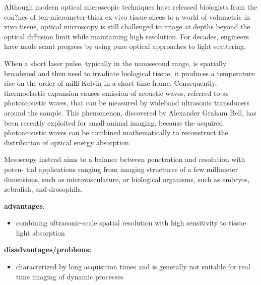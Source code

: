 Although modern optical microscopic techniques have released biologists from the con?nes of ten-micrometer-thick ex vivo tissue slices to a world of volumetric in vivo tissue, optical microscopy is still challenged to image at depths beyond the optical diffusion limit while maintaining high resolution. For decades, engineers have made scant progress by using pure optical approaches to light scattering. 

When a short laser pulse, typically in the nanosecond range, is spatially broadened and then used to irradiate biological tissue, it produces a temperature rise on the order of milli-Kelvin in a short time frame. Consequently, thermoelastic expansion causes emission of acoustic waves, referred to as photoacoustic waves, that can be measured by wideband ultrasonic transducers around the sample. This phenomenon, discovered by Alexander Graham Bell, has been recently exploited for small-animal imaging, because the acquired photoacoustic waves can be combined mathematically to reconstruct the distribution of optical energy absorption. \cite{2005_Ntziachristos_Lookingandlistening}
 
Mesoscopy instead aims to a balance between penetration and resolution with poten- tial applications ranging from imaging structures of a few millimeter dimensions, such as microvasculature, or biological organisms, such as embryos, zebrafish, and drosophila.\cite{2013_Omar_Rasterscanoptoacoustic}  

\textbf{advantages}:
\begin{itemize}
	\item combining ultrasonic-scale spatial resolution with high sensitivity to tissue light absorption
\end{itemize}

\textbf{disadvantages/problems:}
\begin{itemize}
	\item characterized by long acquisition times and is generally not suitable for real time imaging of dynamic processes
\end{itemize}

